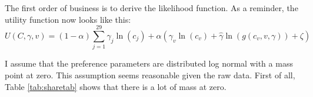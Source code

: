 \documentclass{article}
\begin{document}
The first order of business is to derive the likelihood function.
As a reminder, the utility function now looks like this:
\begin{equation}
	\label{totuti}
U(C,\gamma,v) = (1-\alpha) \sum_{j=1}^{29}\gamma_j \ln(c_j )  + \alpha \left(\gamma_v \ln(c_v)+ \hat{\gamma}\ln(g(c_v,v,\gamma))  + \zeta \right)
\end{equation}

I assume that the preference parameters are distributed log normal with a mass point at zero.
This assumption seems reasonable given the raw data.
First of all, Table \ref{tab:sharetab} shows that there is a lot of mass at zero.
\end{document}
